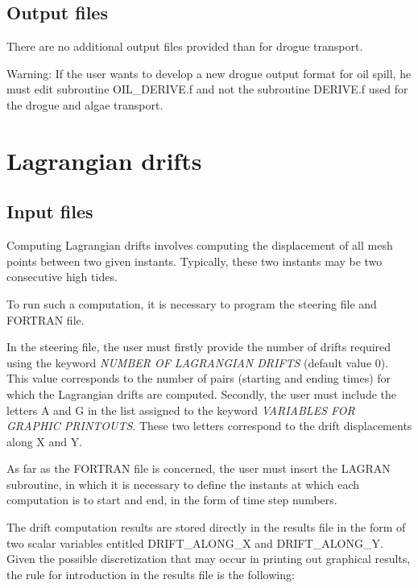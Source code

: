 \subsection{ Output files}

 There are no additional output files provided than for drogue transport.

\begin{WarningBlock}{Warning:}
 If the user wants to develop a new drogue output format for oil spill, he must edit subroutine OIL\_DERIVE.f and not the subroutine DERIVE.f used for the drogue and algae transport.
\end{WarningBlock}

\section{ Lagrangian drifts}
\label{sec:lagr:drifts}

\subsection{ Input files}

 Computing Lagrangian drifts involves computing the displacement of all mesh points between two given instants. Typically, these two instants may be two consecutive high tides.

 To run such a computation, it is necessary to program the steering file and FORTRAN file.

 In the steering file, the user must firstly provide the number of drifts required using the keyword \textit{NUMBER OF LAGRANGIAN DRIFTS} (default value 0). This value corresponds to the number of pairs (starting and ending times) for which the Lagrangian drifts are computed. Secondly, the user must include the letters A and G in the list assigned to the keyword \textit{VARIABLES FOR GRAPHIC PRINTOUTS}. These two letters correspond to the drift displacements along X and Y.

 As far as the FORTRAN file is concerned, the user must insert the LAGRAN subroutine, in which it is necessary to define the instants at which each computation is to start and end, in the form of time step numbers.

 The drift computation results are stored directly in the  results file in the form of two scalar variables entitled DRIFT\_ALONG\_X and DRIFT\_ALONG\_Y. Given the possible discretization that may occur in printing out graphical results, the rule for introduction in the results file is the following:

